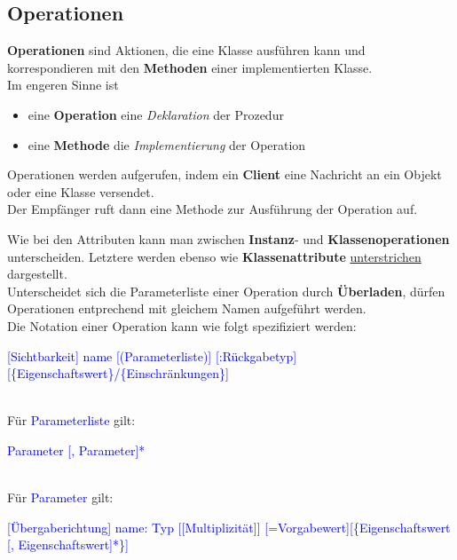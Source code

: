 \subsection{Operationen}

\textbf{Operationen} sind Aktionen, die eine Klasse ausführen kann und korrespondieren mit den \textbf{Methoden} einer implementierten Klasse.\\

\noindent
Im engeren Sinne ist
\begin{itemize}
    \item eine \textbf{Operation} eine \textit{Deklaration} der Prozedur
    \item eine \textbf{Methode} die \textit{Implementierung} der Operation
\end{itemize}

\noindent
Operationen werden aufgerufen, indem ein \textbf{Client} eine Nachricht an ein Objekt oder eine Klasse versendet.\\
Der Empfänger ruft dann eine Methode zur Ausführung der Operation auf.

\noindent
Wie bei den Attributen kann man zwischen \textbf{Instanz}- und \textbf{Klassenoperationen} unterscheiden.
Letztere werden ebenso wie \textbf{Klassenattribute} \underline{unterstrichen} dargestellt.\\

\noindent
Unterscheidet sich die Parameterliste einer Operation durch \textbf{Überladen}, dürfen Operationen entprechend mit gleichem Namen aufgeführt werden.\\

\noindent
Die Notation einer Operation kann wie folgt spezifiziert werden:

\medskip
\noindent
\begin{small}
    \textcolor{blue}{[Sichtbarkeit] name [(Parameterliste)] [:Rückgabetyp][\{Eigenschaftswert\}/\{Einschränkungen\}]}
\end{small}\\

\noindent
Für \textcolor{blue}{Parameterliste} gilt:\\
\begin{small}
    \textcolor{blue}{Parameter [, Parameter]*}\\
\end{small}\\


\noindent
Für \textcolor{blue}{Parameter} gilt:\\
\medskip
\noindent
\begin{small}
    \textcolor{blue}{[Übergaberichtung] name: Typ [[Multiplizität]] [=Vorgabewert][\{Eigenschaftswert [, Eigenschaftswert]*\}]}\\
\end{small}\\

